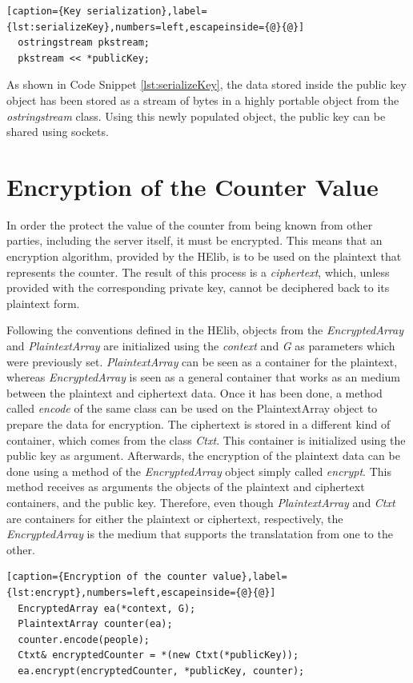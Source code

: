\begin{lstlisting}[caption={Key serialization},label={lst:serializeKey},numbers=left,escapeinside={@}{@}]
  ostringstream pkstream;
  pkstream << *publicKey;
\end{lstlisting}

As shown in Code Snippet \ref{lst:serializeKey}, the data stored inside the public key object has been stored as a stream of bytes in a highly portable object from the \textit{ostringstream} class. Using this newly populated object, the public key can be shared using sockets.

\section{{Encryption of the Counter Value}}

In order the protect the value of the counter from being known from other parties, including the server itself, it must be encrypted. This means that an encryption algorithm, provided by the HElib, is to be used on the plaintext that represents the counter. The result of this process is a \emph{ciphertext}, which, unless provided with the corresponding private key, cannot be deciphered back to its plaintext form. 

Following the conventions defined in the HElib, objects from the \textit{EncryptedArray} and \textit{PlaintextArray} are initialized using the \textit{context} and \textit{G} as parameters which were previously set. \textit{PlaintextArray} can be seen as a container for the plaintext, whereas \textit{EncryptedArray} is seen as a general container that works as an medium between the plaintext and ciphertext data. Once it has been done, a method called \textit{encode} of the same class can be used on the PlaintextArray object to prepare the data for encryption. The ciphertext is stored in a different kind of container, which comes from the class \textit{Ctxt}. This container is initialized using the public key as argument. Afterwards, the encryption of the plaintext data can be done using a method of the \textit{EncryptedArray} object simply called \textit{encrypt}. This method receives as arguments the objects of the plaintext and ciphertext containers, and the public key. Therefore, even though \textit{PlaintextArray} and \textit{Ctxt} are containers for either the plaintext or ciphertext, respectively, the \textit{EncryptedArray} is the medium that supports the translatation from one to the other.

\begin{lstlisting}[caption={Encryption of the counter value},label={lst:encrypt},numbers=left,escapeinside={@}{@}]
  EncryptedArray ea(*context, G);
  PlaintextArray counter(ea);  
  counter.encode(people);
  Ctxt& encryptedCounter = *(new Ctxt(*publicKey));  
  ea.encrypt(encryptedCounter, *publicKey, counter); 
\end{lstlisting}

